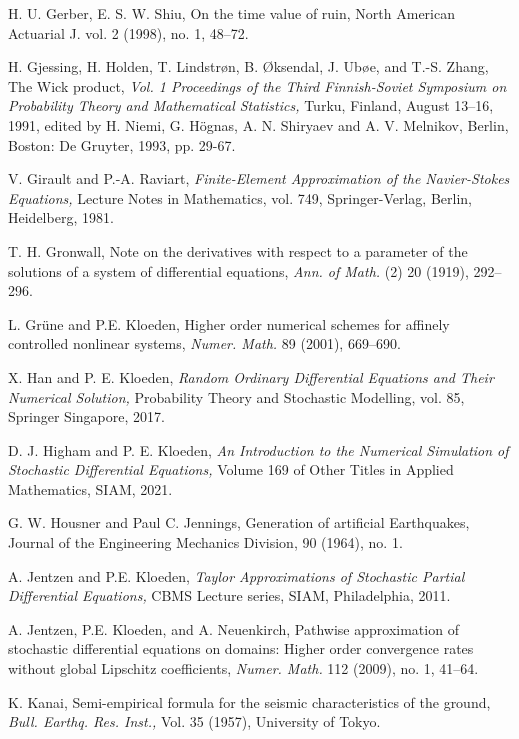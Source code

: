 \documentclass[reqno,12pt]{amsart}
\theoremstyle{plain} %
\theoremstyle{definition} %
\begin{document}
\begin{thebibliography}{25}
     H. U. Gerber, E. S. W. Shiu, On the time value of ruin, North American Actuarial J. 
    vol. 2 (1998), no. 1, 48--72.

     H. Gjessing, H. Holden, T. Lindstr{\o}n, B. {\O}ksendal, J. Ub{\o}e, and T.-S. Zhang, The Wick product, \emph{Vol. 1 Proceedings of the Third Finnish-Soviet Symposium on Probability Theory and Mathematical Statistics,} Turku, Finland, August 13--16, 1991, edited by H. Niemi, G. H\"ognas, A. N. Shiryaev and A. V. Melnikov, Berlin, Boston: De Gruyter, 1993, pp. 29-67.

     V. Girault and P.-A. Raviart, \emph{Finite-Element Approximation of the Navier-Stokes Equations,} Lecture Notes in Mathematics, vol. 749, Springer-Verlag, Berlin, Heidelberg, 1981.

     T. H. Gronwall, Note on the derivatives with respect to a parameter of the solutions of a system of differential equations, \emph{Ann. of Math.} (2) 20 (1919), 292--296.

     L. Gr\"une and P.E. Kloeden, Higher order numerical schemes for affinely controlled nonlinear systems, \emph{Numer. Math.} 89 (2001), 669--690.

     X. Han and P. E. Kloeden, \emph{Random Ordinary Differential Equations and Their Numerical Solution,} Probability Theory and Stochastic Modelling, vol. 85, Springer Singapore, 2017.

     D. J. Higham and P. E. Kloeden, \emph{An Introduction to the Numerical Simulation of Stochastic Differential Equations,} Volume 169 of Other Titles in Applied Mathematics, SIAM, 2021.

     G. W. Housner and Paul C. Jennings, Generation of artificial Earthquakes, Journal of the Engineering Mechanics Division, 90 (1964), no. 1.

     A. Jentzen and P.E. Kloeden, \emph{Taylor Approximations of Stochastic Partial Differential Equations,} CBMS Lecture series, SIAM, Philadelphia, 2011.

     A. Jentzen, P.E. Kloeden, and A. Neuenkirch, Pathwise approximation of stochastic differential equations on domains: Higher order convergence rates without global Lipschitz coefficients, \emph{Numer. Math.} 112 (2009), no. 1, 41--64.

     K. Kanai, Semi-empirical formula for the seismic characteristics of the ground, \emph{Bull. Earthq. Res. Inst.,} Vol. 35 (1957), University of Tokyo.


\end{thebibliography}
\end{document}
